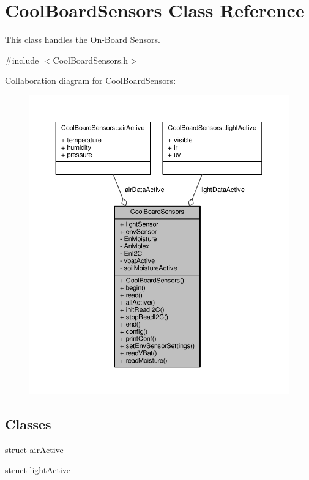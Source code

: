 \hypertarget{classCoolBoardSensors}{}\section{Cool\+Board\+Sensors Class Reference}
\label{classCoolBoardSensors}


This class handles the On-\/\+Board Sensors.  




{\ttfamily \#include $<$Cool\+Board\+Sensors.\+h$>$}



Collaboration diagram for Cool\+Board\+Sensors\+:
\nopagebreak
\begin{figure}[H]
\begin{center}
\leavevmode
\includegraphics[width=350pt]{classCoolBoardSensors__coll__graph}
\end{center}
\end{figure}
\subsection*{Classes}
\begin{DoxyCompactItemize}
\item 
struct \hyperlink{structCoolBoardSensors_1_1airActive}{air\+Active}
\item 
struct \hyperlink{structCoolBoardSensors_1_1lightActive}{light\+Active}
\end{DoxyCompactItemize}
